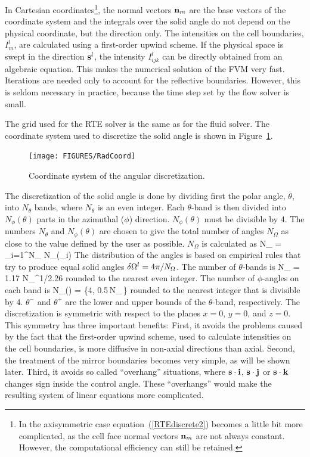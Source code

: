 \documentclass[11pt]{book}
\begin{document}
In Cartesian coordinates\footnote{In the axisymmetric case
equation~(\ref{RTEdiscrete2}) becomes
a little bit more complicated, as the cell face normal vectors ${\bf n}_m$
are not always constant. However, the computational efficiency can still be
retained.},
the normal vectors ${\bf n}_m$ are the base
vectors of the coordinate system and the integrals over the solid
angle do not depend on the physical coordinate, but the direction
only. The intensities on the cell boundaries, $I_m^l$, are calculated
using a first-order upwind scheme.  If the physical space is swept in
the direction ${\bf s}^l$, the intensity $I_{ijk}^l$ can be directly obtained
from an algebraic equation. This makes the numerical solution of the
FVM very fast.  Iterations are needed only to account for the
reflective boundaries. However, this is seldom necessary in
practice, because the time step set by the flow solver is small.

The grid used for the RTE solver is the same as for
the fluid solver.
The coordinate system used to discretize the solid angle is
shown in Figure~\ref{Angular}.
\begin{figure}[ht]
\begin{center}
\texttt{[image: FIGURES/RadCoord]}
\caption{Coordinate system of the angular discretization.}
\label{Angular}
\end{center}
\end{figure}
The discretization of the solid angle is done by dividing first
the polar angle, $\theta$, into $N_{\theta}$ bands, where
$N_{\theta}$ is an even integer.
Each $\theta$-band is then divided into
$N_{\phi}(\theta)$ parts in the azimuthal ($\phi$) direction.
$N_{\phi}(\theta)$ must be divisible by 4.
The numbers $N_{\theta}$ and $N_{\phi}(\theta)$ are chosen
to give the total number of angles $N_{\Omega}$ as close to
the value defined by the user as possible.
$N_{\Omega}$ is calculated as
\be
 N_{\Omega} = \sum_{i=1}^{N_{\theta}} N_{\phi}(\theta_i)
\ee
The distribution of the angles is based on empirical rules that try
to produce equal solid angles $\delta {\Omega}^l = 4\pi/N_{\Omega}$. The
number of $\theta$-bands is
\be
 N_{\theta} = 1.17 \; N_{\Omega}^{1/2.26}
\ee
rounded to the nearest even integer. The number of $\phi$-angles
on each band is
\be
 N_{\phi}(\theta) = \max\left\{4,
        0.5\,N_{\Omega}\,\left[\cos(\theta^-)-\cos(\theta^+)\right]\right\}
\ee
rounded to the nearest integer that is divisible by 4.
$\theta^-$ and $\theta^+$ are
the lower and upper bounds of the $\theta$-band, respectively.
The discretization is symmetric with respect to the planes $x=0$, $y=0$, and
$z=0$. This symmetry has three important benefits:
First, it avoids the problems caused by the fact that the first-order
upwind scheme, used to calculate intensities on the cell boundaries,
is more diffusive in non-axial directions than axial.
Second, the treatment of the mirror boundaries becomes very simple, as
will be shown later. Third,
it avoids so called
``overhang'' situations, where ${\bf s}\cdot {\bf i}$, ${\bf s}\cdot {\bf j}$
or ${\bf s}\cdot {\bf k}$ changes sign inside
the control angle. These ``overhangs'' would make the resulting system of
linear equations more complicated.
\end{document}
